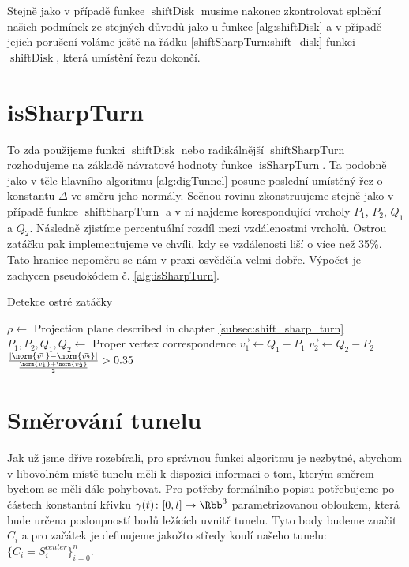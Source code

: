 Stejně jako v případě funkce $ \operatorname{shiftDisk} $ musíme nakonec
zkontrolovat splnění našich podmínek ze stejných důvodů jako u funkce
\ref{alg:shiftDisk} a v případě jejich porušení voláme ještě
na řádku \ref{shiftSharpTurn:shift_disk} funkci $ \operatorname{shiftDisk} $,
která umístění řezu dokončí.





\section{isSharpTurn} \label{subsec:is_sharp_turn}
To zda použijeme funkci $ \operatorname{shiftDisk} $ nebo radikálnější
$ \operatorname{shiftSharpTurn} $ rozhodujeme na základě návratové hodnoty
funkce $ \operatorname{isSharpTurn} $. Ta podobně jako v těle hlavního
algoritmu \ref{alg:digTunnel} posune poslední umístěný řez o konstantu
$ \Delta $ ve směru jeho normály. Sečnou rovinu zkonstruujeme stejně jako v
případě funkce $ \operatorname{shiftSharpTurn} $ a v ní najdeme korespondující
vrcholy $ P_1$, $P_2$, $Q_1$ a $ Q_2 $. Následně zjistíme percentuální rozdíl
mezi vzdálenostmi vrcholů. Ostrou zatáčku pak implementujeme ve chvíli, kdy se
vzdálenosti liší o více než 35\%. Tato hranice nepoměru se nám v praxi osvědčila
velmi dobře. Výpočet je zachycen pseudokódem č. \ref{alg:isSharpTurn}.

\begin{algorithm}
\caption{Detekce ostré zatáčky}
\label{alg:isSharpTurn}
\begin{algorithmic}[1]

    \State $ \rho \gets $ Projection plane described in chapter \ref{subsec:shift_sharp_turn}
    \State $ P_1, P_2, Q_1, Q_2 \gets $ Proper vertex correspondence
    \State $ \vec{v_1} \gets Q_1 - P_1 $
    \State $ \vec{v_2} \gets Q_2 - P_2 $
    \State \Return $ \frac{\left| \norm{\vec{v_1}} - \norm{\vec{v_2}} \right|}
                          {\frac{\norm{\vec{v_1}} + \norm{\vec{v_2}}}{2}} > 0.35$
\EndFunction

\end{algorithmic}
\end{algorithm}





\section{Směrování tunelu} \label{subsec:tunnel_dir}
Jak už jsme dříve rozebírali, pro správnou funkci algoritmu je nezbytné, abychom
v libovolném místě tunelu měli k dispozici informaci o tom, kterým směrem bychom
se měli dále pohybovat. Pro potřeby formálního popisu potřebujeme
po částech konstantní křivku $ \gamma(t) \colon [0, l] \to \Rbb^3$
parametrizovanou obloukem, která bude
určena posloupností bodů ležících uvnitř tunelu. Tyto body budeme značit
$ C_i $ a pro začátek je definujeme jakožto středy koulí našeho tunelu:
$ \{C_i = S_i^{center}\}_{i=0}^{n} $.

